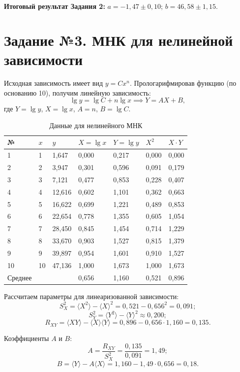 \textbf{Итоговый результат Задания 2:}
$a = -1,47 \pm 0,10$; $b = 46,58 \pm 1,15$.

\section*{Задание №3. МНК для нелинейной зависимости}
Исходная зависимость имеет вид $y = C x^n$. Прологарифмировав функцию (по основанию 10), получим линейную зависимость:
$$ \lg y = \lg C + n \lg x \implies Y = A X + B, $$
где $Y = \lg y$, $X = \lg x$, $A = n$, $B = \lg C$.

\begin{table}[h!]
	\centering
	\caption{Данные для нелинейного МНК}
	\begin{tabular}{@{}lllllll@{}}
		\toprule
		№ & $x$ & $y$ & $X = \lg x$ & $Y = \lg y$ & $X^2$ & $X \cdot Y$ \\ \midrule
		1 & 1  & 1,647 & 0,000 & 0,217 & 0,000 & 0,000 \\
		2 & 2  & 3,947 & 0,301 & 0,596 & 0,091 & 0,179 \\
		3 & 3  & 7,121 & 0,477 & 0,853 & 0,228 & 0,407 \\
		4 & 4  & 12,616 & 0,602 & 1,101 & 0,362 & 0,663 \\
		5 & 5  & 16,622 & 0,699 & 1,221 & 0,489 & 0,853 \\
		6 & 6  & 22,654 & 0,778 & 1,355 & 0,605 & 1,054 \\
		7 & 7  & 28,450 & 0,845 & 1,454 & 0,714 & 1,229 \\
		8 & 8  & 33,670 & 0,903 & 1,527 & 0,815 & 1,379 \\
		9 & 9  & 39,897 & 0,954 & 1,601 & 0,910 & 1,527 \\
		10 & 10 & 47,136 & 1,000 & 1,673 & 1,000 & 1,673 \\ \midrule
		Среднее & & & 0,656 & 1,160 & 0,521 & 0,896 \\ \bottomrule
	\end{tabular}
\end{table}

Рассчитаем параметры для линеаризованной зависимости:
$$ S_X^2 = \langle X^2 \rangle - \langle X \rangle^2 = 0,521 - 0,656^2 = 0,091; $$
$$ S_Y^2 = \langle Y^2 \rangle - \langle Y \rangle^2 \approx 0,200; $$
$$ R_{XY} = \langle XY \rangle - \langle X \rangle \langle Y \rangle = 0,896 - 0,656 \cdot 1,160 = 0,135. $$

Коэффициенты $A$ и $B$:
$$ A = \frac{R_{XY}}{S_X^2} = \frac{0,135}{0,091} = 1,49; $$
$$ B = \langle Y \rangle - A\langle X \rangle = 1,160 - 1,49 \cdot 0,656 = 0,18. $$


